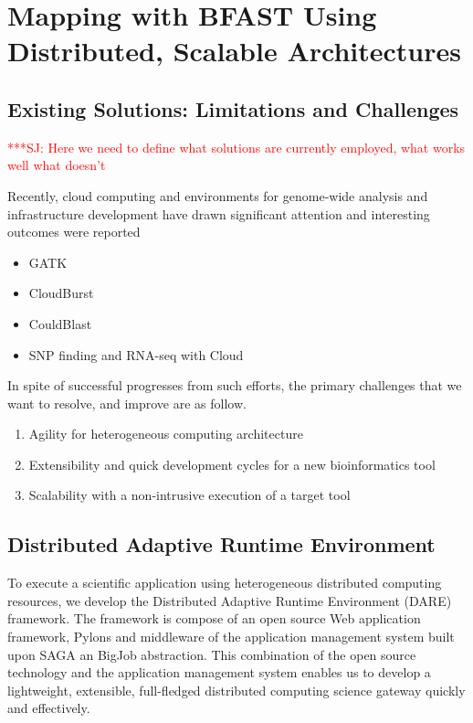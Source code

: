 \documentclass[12pt]{article}
\newcommand{\jhanote}[1]{ {\textcolor{red}     {***SJ: #1}}}
\newcommand{\jhanote}[1]{}
\begin{document}
\section{Mapping with BFAST Using Distributed, Scalable Architectures}

\subsection{Existing Solutions: Limitations and Challenges}

\jhanote{Here we need to define what solutions are currently employed, what works well
  what doesn't}

Recently, cloud computing and environments for genome-wide analysis and infrastructure development have drawn significant attention and interesting outcomes were reported\cite{taylor2010,cloudburst, cloudblast, langmead2009, langmead2010,gatk, halligan2009}

\begin{itemize}
\item GATK\cite{gatk}
\item CloudBurst\cite{cloudburst}
\item CouldBlast\cite{cloudblast}
\item SNP finding and RNA-seq with Cloud\cite{langmead2009, langmead2010}
\end{itemize}

In spite of successful progresses from such efforts, the primary challenges that we want to resolve, and improve are as follow.

\begin{enumerate}
\item Agility for heterogeneous computing architecture
\item Extensibility and quick development cycles for a new bioinformatics tool
\item Scalability with a non-intrusive execution of a target tool  
\end{enumerate}

\subsection{Distributed Adaptive Runtime Environment}

To execute a scientific application using heterogeneous distributed computing resources, we develop the Distributed Adaptive Runtime Environment (DARE) framework\cite{dareurl}.  The framework is compose of an open source Web application framework, Pylons
and middleware of the application management system built upon SAGA an BigJob abstraction\cite{saga-ccgrid10,saga-royalsoc,saga-web,jha2009developing,ecmls10}.  This combination of the open source technology and the application management system enables us to develop a lightweight, extensible, full-fledged distributed computing science gateway quickly and effectively\cite{pylonsurl}. 
\end{document}
